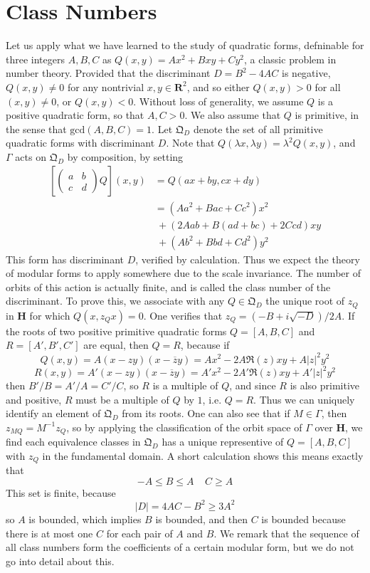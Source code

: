 \section{Class Numbers}

Let us apply what we have learned to the study of quadratic forms, defninable for three integers $A,B,C$ as $Q(x,y) = Ax^2 + Bxy + Cy^2$, a classic problem in number theory. Provided that the discriminant $D = B^2 - 4AC$ is negative, $Q(x,y) \neq 0$ for any nontrivial $x,y \in \mathbf{R}^2$, and so either $Q(x,y) > 0$ for all $(x,y) \neq 0$, or $Q(x,y) < 0$. Without loss of generality, we assume $Q$ is a positive quadratic form, so that $A, C > 0$. We also assume that $Q$ is primitive, in the sense that $\text{gcd}(A,B,C) = 1$. Let $\mathfrak{Q}_D$ denote the set of all primitive quadratic forms with discriminant $D$. Note that $Q(\lambda x, \lambda y) = \lambda^2 Q(x,y)$, and $\Gamma$ acts on $\mathfrak{Q}_D$ by composition, by setting
%
\begin{align*}
    \left[ \begin{pmatrix} a & b \\ c & d \end{pmatrix} Q \right] (x,y) &= Q(ax + by, cx + dy)\\
    &= (Aa^2 + Bac + Cc^2) x^2\\
    &\ + (2Aab + B(ad + bc) + 2Ccd) xy\\
    &\ + (Ab^2 + Bbd + Cd^2) y^2
\end{align*}
%
This form has discriminant $D$, verified by calculation. Thus we expect the theory of modular forms to apply somewhere due to the scale invariance. The number of orbits of this action is actually finite, and is called the class number of the discriminant. To prove this, we associate with any $Q \in \mathfrak{Q}_D$ the unique root of $z_Q$ in $\mathbf{H}$ for which $Q(x,z_Q x) = 0$. One verifies that $z_Q = (-B + i\sqrt{-D})/2A$. If the roots of two positive primitive quadratic forms $Q = [A,B,C]$ and $R = [A',B',C']$ are equal, then $Q = R$, because if
%
\[ Q(x,y) = A (x - z y)(x - \overline{z} y) = Ax^2 - 2 A\Re(z) xy + A|z|^2 y^2 \]
\[ R(x,y) = A' (x - z y)(x - \overline{z} y) = A'x^2 - 2A'\Re(z) xy + A'|z|^2 y^2 \]
%
then $B'/B = A'/A = C'/C$, so $R$ is a multiple of $Q$, and since $R$ is also primitive and positive, $R$ must be a multiple of $Q$ by $1$, i.e. $Q = R$. Thus we can uniquely identify an element of $\mathfrak{Q}_D$ from its roots. One can also see that if $M \in \Gamma$, then $z_{MQ} = M^{-1}z_Q$, so by applying the classification of the orbit space of $\Gamma$ over $\mathbf{H}$, we find each equivalence classes in $\mathfrak{Q}_D$ has a unique representive of $Q = [A,B,C]$ with $z_Q$ in the fundamental domain. A short calculation shows this means exactly that
%
\[ -A \leq B \leq A\ \ \ \ \ C \geq A \]
%
This set is finite, because
%
\[ |D| = 4AC - B^2 \geq 3A^2 \]
%
so $A$ is bounded, which implies $B$ is bounded, and then $C$ is bounded because there is at most one $C$ for each pair of $A$ and $B$. We remark that the sequence of all class numbers form the coefficients of a certain modular form, but we do not go into detail about this.

